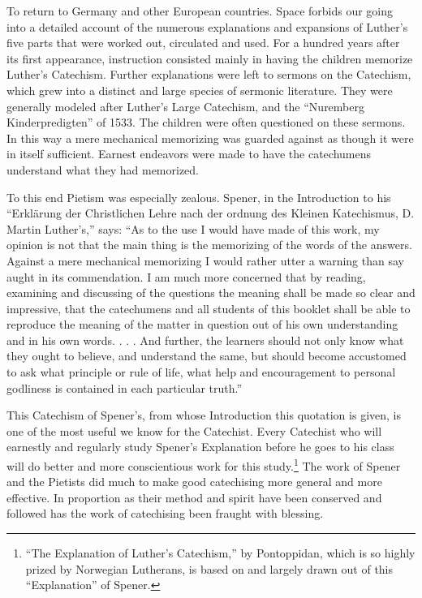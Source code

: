 To return to Germany and other European countries. Space forbids our going into a detailed account of the numerous explanations and expansions of Luther’s five parts that were worked out, circulated and used.  For a hundred years after its first appearance, instruction consisted mainly in having the children memorize Luther’s Catechism. Further explanations were left to sermons on the Catechism, which grew into a distinct and large species of sermonic literature. They were generally modeled after Luther’s Large Catechism, and
the “Nuremberg Kinderpredigten” of 1533. The children were often questioned on these sermons. In this way a mere mechanical memorizing was guarded against as though it were in itself sufficient. Earnest endeavors were made to have the catechumens understand what they had memorized.

 To this end Pietism was especially zealous. Spener, in the Introduction to his “Erklärung der Christlichen Lehre nach der ordnung des Kleinen Katechismus, D. Martin Luther’s,” says: “As to the use I would have made of this work, my opinion is not that the main thing is the memorizing of the words of the answers. Against a mere mechanical memorizing I would rather utter a warning than say aught in its commendation. I am much more concerned that by reading, examining and discussing of the questions the meaning shall be made so clear and impressive, that the catechumens and all students of this booklet shall be able to reproduce the meaning of the matter in question out of his own understanding and in his own words. . . . And further, the learners should not only know what they ought to believe, and understand the same, but should become accustomed to ask what principle or rule of life, what help and encouragement to personal godliness is contained in each particular truth.”

This Catechism of Spener’s, from whose Introduction
this quotation is given, is one of the most useful we know for the Catechist. Every Catechist who will earnestly and regularly study Spener’s Explanation before he goes to his class will do better and more conscientious work for this study.\footnote{“The Explanation of Luther’s Catechism,” by Pontoppidan, which is so highly prized by Norwegian Lutherans, is based on and largely drawn out of this “Explanation” of Spener.} The work of Spener and the Pietists did much to make good catechising more general and more effective. In proportion as their method and spirit have been conserved and followed has the work of catechising been fraught with blessing.

